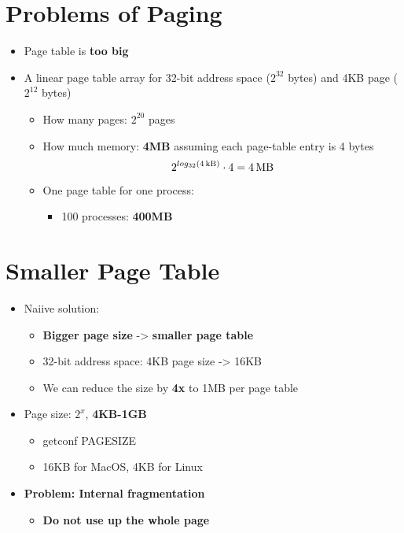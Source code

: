 \documentclass[a4paper,11pt,english]{article}
\begin{document}


\section*{Problems of Paging}
\begin{itemize}
    \item Page table is \textbf{\color{red} too big}
    \item A linear page table array for 32-bit address space ($2^{32}$ bytes) and 4KB page ($2^{12}$ bytes)
        \begin{itemize}
            \item How many pages: $2^{20}$ pages
            \item How much memory: \textbf{\color{red} 4MB} assuming each page-table entry is 4 bytes
                \[
                    2^{log_{32}(\SI{4}{\kilo\byte})} \cdot 4 = \SI{4}{\mega\byte}
                \]
            \item One page table for one process:
                \begin{itemize}
                    \item 100 processes: \textbf{\color{red} 400MB}
                \end{itemize}
        \end{itemize}
\end{itemize}

\section*{Smaller Page Table}
\begin{itemize}
    \item Naiive solution:
        \begin{itemize}
            \item \textbf{\color{blue} Bigger page size} -> \textbf{\color{blue} smaller page table}
            \item 32-bit address space: 4KB page size -> 16KB
            \item We can reduce the size by \textbf{\color{blue} 4x} to 1MB per page table
        \end{itemize}
    \item Page size: $2^x$, \textbf{\color{blue} 4KB-1GB}
        \begin{itemize}
            \item getconf PAGESIZE
            \item 16KB for MacOS, 4KB for Linux
        \end{itemize}
    \item \textbf{\color{red} Problem: Internal fragmentation}
        \begin{itemize}
            \item \textbf{Do not use up the whole page}
        \end{itemize}
\end{itemize}
\end{document}
